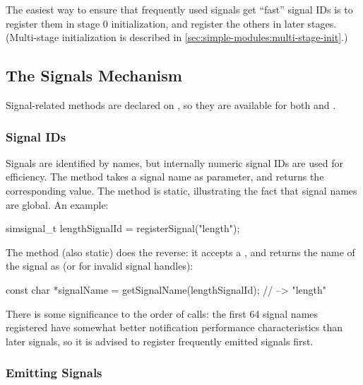 The easiest way to ensure that frequently used signals get ``fast'' signal IDs
is to register them in stage 0 initialization, and register the others
in later stages. (Multi-stage initialization is described in
\ref{sec:simple-modules:multi-stage-init}.)


\subsection{The Signals Mechanism}
\label{sec:simple-modules:signals-api}

Signal-related methods are declared on , so they are available
for both  and .

\subsubsection{Signal IDs}

Signals are identified by names, but internally numeric signal IDs are used
for efficiency. The  method takes a signal name as
parameter, and returns the corresponding  value.
The method is static, illustrating the fact that signal names are global.
An example:

\begin{cpp}
simsignal_t lengthSignalId = registerSignal("length");
\end{cpp}

The  method (also static) does the reverse:
it accepts a , and returns the name of the signal as
 (or  for invalid signal handles):

\begin{cpp}
const char *signalName = getSignalName(lengthSignalId); // --> "length"
\end{cpp}

\begin{note}
  There is some significance to the order of  calls: the
  first 64 signal names registered have somewhat better notification
  performance characteristics than later signals, so it is advised to
  register frequently emitted signals first.
\end{note}

\subsubsection{Emitting Signals}

